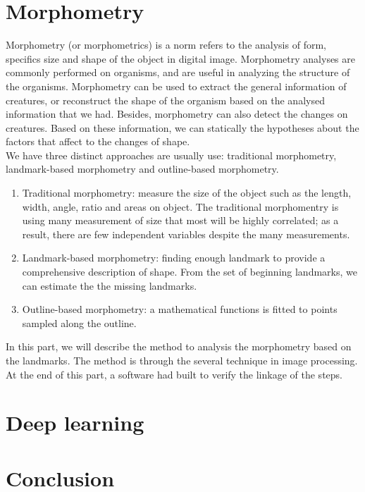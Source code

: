 \documentclass[12pt,a4paper]{report}
\begin{document}


\part{Morphometry}
Morphometry (or morphometrics) is a norm refers to the analysis of form, specifics size and shape of the object in digital image. Morphometry analyses are commonly performed on organisms, and are useful in analyzing the structure of the organisms. Morphometry can be used to extract the general information of creatures, or reconstruct the shape of the organism based on the analysed information that we had. Besides, morphometry can also detect the changes on creatures. Based on these information, we can statically the hypotheses about the factors that affect to the changes of shape.\\[0.2cm]
We have three distinct approaches are usually use: traditional morphometry, landmark-based morphometry and outline-based morphometry.
\begin{enumerate}
	\item Traditional morphometry:  measure the size of the object such as the length, width, angle, ratio and areas on object. The traditional morphomentry is using many measurement of size that most will be highly correlated; as a result, there are few independent variables despite the many measurements.
	\item Landmark-based morphometry: finding enough landmark to provide  a comprehensive description of shape. From the set of beginning landmarks, we can estimate the the missing landmarks.
	\item Outline-based morphometry: a mathematical functions is fitted to points sampled along the outline.
\end{enumerate}
In this part, we will describe the method to analysis the morphometry based on the landmarks. The method is through the several technique in image processing. At the end of this part, a software had built to verify the linkage of the steps.
	
	
	
\part{Deep learning}
	
	
	
	
\part{Conclusion}
	
	


\end{document}
